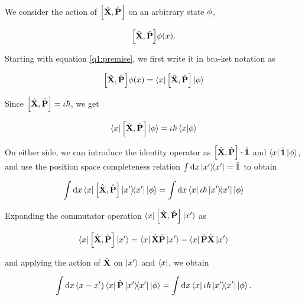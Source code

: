 We consider the action of $\commutator{\Position}{\Momentum}$ 
on an arbitrary state $\phi$, 

\begin{equation}
    \commutator{\Position}{\Momentum} \statephi(\position).
    \label{q1:premise}
\end{equation}

Starting with equation \ref{q1:premise}, we first write it in
bra-ket notation as

\begin{equation}
    \commutator{\Position}{\Momentum} \statephi(\position) = 
        \bra{\position} \commutator{\Position}{\Momentum} \ket{\statephi}
\end{equation}

Since $\commutator{\Position}{\Momentum} = \iota \hbar$, we get

\begin{equation}
    \bra{\position} \commutator{\Position}{\Momentum} \ket{\statephi} =
        \iota \hbar \braket{\position}{\statephi}
\end{equation}

On either side, we can introduce the identity operator as 
$\commutator{\Position}{\Momentum} \cdot \Identity$ and 
$\bra{x}\hat{\textbf{1}}\ket{\phi}$, and use the 
position space completeness relation $\int 
\dd{x} \ketbra{x'}{x'} = \hat{\textbf{1}}$ to obtain

\begin{equation}
    \int \dd{x} \bra{\position}\commutator{\Position}{\Momentum}
    \ketbra{\position'}{\position'}\ket{\statephi} =
    \int \dd{x} \bra{\position}\iota \hbar
    \ketbra{\position'}{\position'}\ket{\statephi}
\end{equation}

Expanding the commutator operation $\bra{\position}
\commutator{\Position}{\Momentum}\ket{\position'}$ as

\begin{equation}
    \bra{\position}\commutator{\Position}{\Momentum}\ket{\position'}
    = \bra{\position}\Position\Momentum\ket{\position'} - 
        \bra{\position}\Momentum\Position\ket{\position'} 
    \nonumber
\end{equation}

and applying the action of $\hat{\textbf{X}}$ on $\ket{x'}$
and $\bra{x}$, we obtain

\begin{equation}
    \int \dd{x} (x - x')\bra{x}\hat{\textbf{P}}
    \ketbra{x'}{x'}\ket{\phi} =
    \int \dd{x} \bra{x}\iota \hbar
    \ketbra{x'}{x'}\ket{\phi}.
\end{equation}


